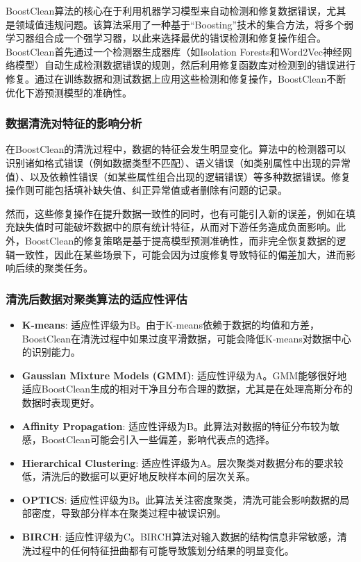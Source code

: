 \documentclass{ctexart} %
\begin{document}
BoostClean算法的核心在于利用机器学习模型来自动检测和修复数据错误，尤其是领域值违规问题。该算法采用了一种基于“Boosting”技术的集合方法，将多个弱学习器组合成一个强学习器，以此来选择最优的错误检测和修复操作组合。BoostClean首先通过一个检测器生成器库（如Isolation Forests和Word2Vec神经网络模型）自动生成检测数据错误的规则，然后利用修复函数库对检测到的错误进行修复。通过在训练数据和测试数据上应用这些检测和修复操作，BoostClean不断优化下游预测模型的准确性。

\subsubsection{数据清洗对特征的影响分析}

在BoostClean的清洗过程中，数据的特征会发生明显变化。算法中的检测器可以识别诸如格式错误（例如数据类型不匹配）、语义错误（如类别属性中出现的异常值）、以及依赖性错误（如某些属性组合出现的逻辑错误）等多种数据错误。修复操作则可能包括填补缺失值、纠正异常值或者删除有问题的记录。

然而，这些修复操作在提升数据一致性的同时，也有可能引入新的误差，例如在填充缺失值时可能破坏数据中的原有统计特征，从而对下游任务造成负面影响。此外，BoostClean的修复策略是基于提高模型预测准确性，而非完全恢复数据的逻辑一致性，因此在某些场景下，可能会因为过度修复导致特征的偏差加大，进而影响后续的聚类任务。

\subsubsection{清洗后数据对聚类算法的适应性评估}
\begin{itemize}
    \item \textbf{K-means}: 适应性评级为B。由于K-means依赖于数据的均值和方差，BoostClean在清洗过程中如果过度平滑数据，可能会降低K-means对数据中心的识别能力。
    \item \textbf{Gaussian Mixture Models (GMM)}: 适应性评级为A。GMM能够很好地适应BoostClean生成的相对干净且分布合理的数据，尤其是在处理高斯分布的数据时表现更好。
    \item \textbf{Affinity Propagation}: 适应性评级为B。此算法对数据的特征分布较为敏感，BoostClean可能会引入一些偏差，影响代表点的选择。
    \item \textbf{Hierarchical Clustering}: 适应性评级为A。层次聚类对数据分布的要求较低，清洗后的数据可以更好地反映样本间的层次关系。
    \item \textbf{OPTICS}: 适应性评级为B。此算法关注密度聚类，清洗可能会影响数据的局部密度，导致部分样本在聚类过程中被误识别。
    \item \textbf{BIRCH}: 适应性评级为C。BIRCH算法对输入数据的结构信息非常敏感，清洗过程中的任何特征扭曲都有可能导致簇划分结果的明显变化。
\end{itemize}
\end{document}
